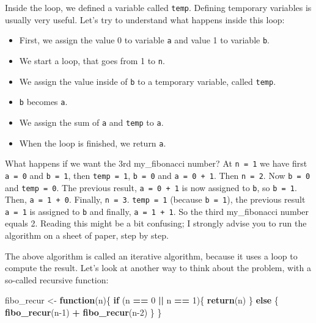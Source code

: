 \documentclass[]{gitbook}
\newenvironment{Shaded}{\begin{snugshade}}{\end{snugshade}}
\newcommand{\ControlFlowTok}[1]{\textcolor[rgb]{0.13,0.29,0.53}{\textbf{#1}}}
\newcommand{\DecValTok}[1]{\textcolor[rgb]{0.00,0.00,0.81}{#1}}
\newcommand{\KeywordTok}[1]{\textcolor[rgb]{0.13,0.29,0.53}{\textbf{#1}}}
\newcommand{\NormalTok}[1]{#1}
\newcommand{\OperatorTok}[1]{\textcolor[rgb]{0.81,0.36,0.00}{\textbf{#1}}}
\newcommand{\StringTok}[1]{\textcolor[rgb]{0.31,0.60,0.02}{#1}}
\providecommand{\tightlist}{%
  \setlength{\itemsep}{0pt}\setlength{\parskip}{0pt}}
\begin{document}
Inside the loop, we defined a variable called \texttt{temp}. Defining temporary variables is usually very
useful. Let's try to understand what happens inside this loop:

\begin{itemize}
\tightlist
\item
  First, we assign the value 0 to variable \texttt{a} and value 1 to variable \texttt{b}.
\item
  We start a loop, that goes from 1 to \texttt{n}.
\item
  We assign the value inside of \texttt{b} to a temporary variable, called \texttt{temp}.
\item
  \texttt{b} becomes \texttt{a}.
\item
  We assign the sum of \texttt{a} and \texttt{temp} to \texttt{a}.
\item
  When the loop is finished, we return \texttt{a}.
\end{itemize}

What happens if we want the 3rd my\_fibonacci number? At \texttt{n\ =\ 1} we have first \texttt{a\ =\ 0} and \texttt{b\ =\ 1},
then \texttt{temp\ =\ 1}, \texttt{b\ =\ 0} and \texttt{a\ =\ 0\ +\ 1}. Then \texttt{n\ =\ 2}. Now \texttt{b\ =\ 0} and \texttt{temp\ =\ 0}. The previous
result, \texttt{a\ =\ 0\ +\ 1} is now assigned to \texttt{b}, so \texttt{b\ =\ 1}. Then, \texttt{a\ =\ 1\ +\ 0}. Finally, \texttt{n\ =\ 3}. \texttt{temp\ =\ 1} (because \texttt{b\ =\ 1}), the previous result \texttt{a\ =\ 1} is assigned to \texttt{b} and finally, \texttt{a\ =\ 1\ +\ 1}. So
the third my\_fibonacci number equals 2. Reading this might be a bit confusing; I strongly advise you
to run the algorithm on a sheet of paper, step by step.

The above algorithm is called an iterative algorithm, because it uses a loop to compute the result.
Let's look at another way to think about the problem, with a so-called recursive function:

\begin{Shaded}
\begin{Highlighting}[]
\NormalTok{fibo_recur <-}\StringTok{ }\ControlFlowTok{function}\NormalTok{(n)\{}
 \ControlFlowTok{if}\NormalTok{ (n }\OperatorTok{==}\StringTok{ }\DecValTok{0} \OperatorTok{||}\StringTok{ }\NormalTok{n }\OperatorTok{==}\StringTok{ }\DecValTok{1}\NormalTok{)\{}
   \KeywordTok{return}\NormalTok{(n)}
\NormalTok{   \} }\ControlFlowTok{else}\NormalTok{ \{}
   \KeywordTok{fibo_recur}\NormalTok{(n}\DecValTok{-1}\NormalTok{) }\OperatorTok{+}\StringTok{ }\KeywordTok{fibo_recur}\NormalTok{(n}\DecValTok{-2}\NormalTok{)}
\NormalTok{   \}}
\NormalTok{\}}
\end{Highlighting}
\end{Shaded}
\end{document}

